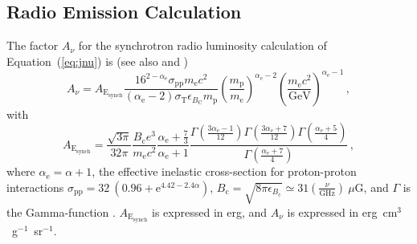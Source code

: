 \documentclass[traditabstract]{aa}
\newcommand{\rmn}{\mathrm}
\begin{document}
\begin{appendix}
%



\section{Radio Emission Calculation}
\label{app:A}

The factor $A_{\nu}$ for the synchrotron radio luminosity calculation of Equation~(\ref{eq:jnu}) is (see also \citealp{2008MNRAS.385.1211P} and \citealp{2011A&A...527A..99E})
%
\begin{equation}
A_{\nu} = A_{\rmn{E_{synch}}} \frac{16^{2-\alpha_{\rmn{e}}}\sigma_{\rmn{pp}}m_{\rmn{e}}c^{2}}{(\alpha_{\rmn{e}}-2)\sigma_{\rmn{T}}\epsilon_{B_{\rmn{C}}}m_{\rmn{p}}}\left(\frac{m_{\rmn{p}}
}{m_{\rmn{e}}}\right)^{\alpha_{\rmn{e}}-2} \left(\frac{m_{\rmn{e}}c^{2}}{\rmn{GeV}}\right)^{\alpha_{\rmn{e}}-1} \, ,
\end{equation}
%
with
%
\begin{equation}
A_{\rmn{E_{synch}}} = \frac{\sqrt{3\pi}}{32\pi}\frac{B_{\rmn{c}}e^{3}}{m_{\rmn{e}}c^{2}}\frac{\alpha_{\rmn{e}}+\frac{7}{3}}{\alpha_{\rmn{e}}+1}\frac{\Gamma\left(\frac{3\alpha_{\rmn{e}}-1}{12}\right)\Gamma\left(\frac{3\alpha_{\rmn{e}}+7}{12}\right)\Gamma\left(\frac{\alpha_{\rmn{e}}+5}{4}\right)}{\Gamma\left(\frac{\alpha_{\rmn{e}}+7}{4}\right)} \, ,
\end{equation}
%
where $\alpha_{\rmn{e}}=\alpha+1$, the effective inelastic cross-section for proton-proton interactions $\sigma_{\rmn{pp}} = 32~(0.96+\rmn{e}^{4.42-2.4\alpha})$, $B_{\rmn{c}} = \sqrt{ 8 \pi \epsilon_{B_{\rmn{c}}}} \simeq 31 \left( \frac{\nu}{\rmn{GHz}} \right)~\mu$G, and $\Gamma$ is the Gamma-function \citep{1965hmfw.book.....A}. $A_{\rmn{E_{synch}}}$ is expressed in erg, and $A_{\nu}$ is expressed in erg~cm$^{3}$~g$^{-1}$~sr$^{-1}$. 



\end{appendix}
\end{document}
